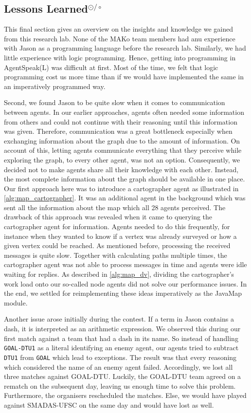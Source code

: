 \subsection[Lessons Learned]{Lessons Learned$^{\odot/\circ}$}\label{con:learned}
This final section gives an overview on the insights and knowledge we gained from this research lab.
None of the MAKo team members had anu experience with Jason as a programming language before the research lab.
Similarly, we had little experience with logic programming.
Hence, getting into programming in AgentSpeak(L) was difficult at first.
Most of the time, we felt that logic programming cost us more time than if we would have implemented the same in an imperatively programmed way.

Second, we found Jason to be quite slow when it comes to communication between agents.
In our earlier approaches, agents often needed some information from others and could not continue with their reasoning until this information was given.
Therefore, communication was a great bottleneck especially when exchanging information about the graph due to the amount of information.
On account of this, letting agents communicate everything that they perceive while exploring the graph, to every other agent, was not an option.
Consequently, we decided not to make agents share all their knowledge with each other.
Instead, the most complete information about the graph should be available in one place.
Our first approach here was to introduce a cartographer agent as illustrated in \autoref{alg:map_cartographer}.
It was an additional agent in the background which was sent all the information about the map which all 28 agents perceived.
The drawback of this approach was revealed when it came to querying the cartographer agent for information.
Agents needed to do this frequently, for instance when they wanted to know if a vertex was already surveyed or how a given vertex could be reached.
As mentioned before, processing the received messages is quite slow.
Together with calculating paths multiple times, the cartographer agent was not able to process messages in time and agents were idle waiting for replies.
As described in \autoref{alg:map_dv}, dividing the cartographer's work load onto our so-called node agents did not solve our performance issues.
In the end, we settled for reimplementing these ideas imperatively as the JavaMap module.

Another issue arose initially during the contest.
If a term in Jason contains a dash, it is interpreted as an arithmetic expression.
We observed this during our first match against a team that had a dash in its name.
So instead of handling \texttt{GOAL-DTU1} as a literal identifying an enemy agent, our agents tried to subtract \texttt{DTU1} from \texttt{GOAL} which lead to exceptions.
The result was that every reasoning which considered the name of an enemy agent failed.
Accordingly, we lost all three matches against GOAL-DTU.
Luckily, the GOAL-DTU team agreed on a rematch on the subsequent day, leaving us enough time to solve this problem.
Furthermore, the organisers rescheduled the matches.
Else, we would have played against SMADAS-UFSC on the same day and would have lost as well.

